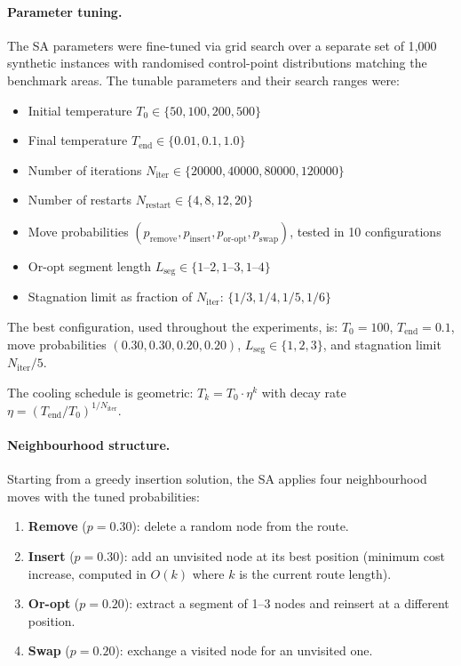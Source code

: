 \documentclass[11pt,a4paper]{article}
\begin{document}
\paragraph{Parameter tuning.}
The SA parameters were fine-tuned via grid search over a separate set of 1{,}000 synthetic instances with randomised control-point distributions matching the benchmark areas.
The tunable parameters and their search ranges were:
\begin{itemize}[nosep]
  \item Initial temperature $T_0 \in \{50, 100, 200, 500\}$
  \item Final temperature $T_{\text{end}} \in \{0.01, 0.1, 1.0\}$
  \item Number of iterations $N_{\text{iter}} \in \{20000, 40000, 80000, 120000\}$
  \item Number of restarts $N_{\text{restart}} \in \{4, 8, 12, 20\}$
  \item Move probabilities $(p_{\text{remove}}, p_{\text{insert}}, p_{\text{or-opt}}, p_{\text{swap}})$, tested in 10 configurations
  \item Or-opt segment length $L_{\text{seg}} \in \{1\text{--}2, 1\text{--}3, 1\text{--}4\}$
  \item Stagnation limit as fraction of $N_{\text{iter}}$: $\{1/3, 1/4, 1/5, 1/6\}$
\end{itemize}

The best configuration, used throughout the experiments, is: $T_0 = 100$, $T_{\text{end}} = 0.1$, move probabilities $(0.30, 0.30, 0.20, 0.20)$, $L_{\text{seg}} \in \{1,2,3\}$, and stagnation limit $N_{\text{iter}}/5$.

The cooling schedule is geometric: $T_k = T_0 \cdot \eta^k$ with decay rate $\eta = (T_{\text{end}}/T_0)^{1/N_{\text{iter}}}$.

\paragraph{Neighbourhood structure.}
Starting from a greedy insertion solution, the SA applies four neighbourhood moves with the tuned probabilities:
\begin{enumerate}[nosep]
  \item \textbf{Remove} ($p = 0.30$): delete a random node from the route.
  \item \textbf{Insert} ($p = 0.30$): add an unvisited node at its best position (minimum cost increase, computed in $O(k)$ where $k$ is the current route length).
  \item \textbf{Or-opt} ($p = 0.20$): extract a segment of 1--3 nodes and reinsert at a different position.
  \item \textbf{Swap} ($p = 0.20$): exchange a visited node for an unvisited one.
\end{enumerate}
\end{document}
